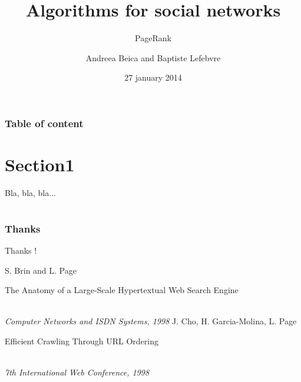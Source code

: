 \documentclass[9pt]{beamer}
\begin{document}
  
  \title{Algorithms for social networks}
  \subtitle{PageRank}
  \author{Andreea Beica and Baptiste Lefebvre}
  \date{27 january 2014}
  \maketitle

  
\begin{frame}
  \frametitle{Table of content}
  \tableofcontents
\end{frame}


\section{Section1}

\begin{frame}
Bla, bla, bla...
\end{frame}


\section{}

\begin{frame}
  \frametitle{Thanks}
  \begin{center}
    Thanks !
  \end{center}
\end{frame}

\begin{frame}
  \begin{thebibliography}{1}
      S. Brin and L. Page\\
      \begin{bf} The Anatomy of a Large-Scale Hypertextual Web Search Engine \end{bf}\\
      \emph{Computer Networks and ISDN Systems, 1998}
      J. Cho, H. Garcia-Molina, L. Page\\
      \begin{bf} Efficient Crawling Through URL Ordering \end{bf}\\
      \emph{7th International Web Conference, 1998}
  \end{thebibliography}
\end{frame}
\end{document}

